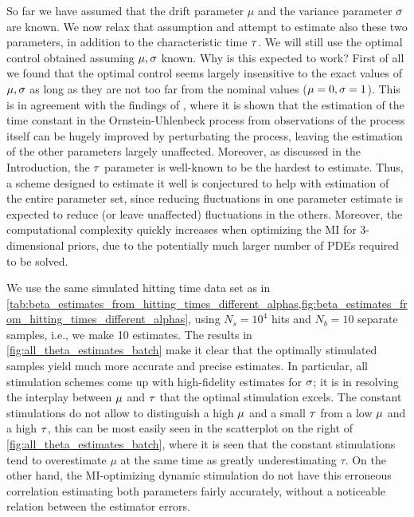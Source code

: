 \documentclass[12pt]{article}
\begin{document}
So far we have assumed that the drift parameter $\mu$ and the variance
parameter ${\sigma }$ are known. We now relax that
assumption and attempt to estimate also these two parameters,
 in addition to the 
characteristic time ${ \tau }$. We will still use the optimal control obtained assuming
${\mu },{\sigma }$ known. Why is this expected to work? First of all we found that the
optimal control seems largely insensitive to the exact values of ${\mu },{\sigma }$ as long
as they are not too far from the nominal values (${\mu }=0, {\sigma }=1$). This
is in agreement with the findings of
\cite{DitlevsenLansky212}, where it is shown that the estimation of the time constant in the
Ornstein-Uhlenbeck process from observations of the process itself can be hugely improved by perturbating the
process, leaving the estimation of the other parameters largely
unaffected. Moreover, as
discussed in the Introduction, the ${ \tau }$ parameter is well-known to be the
hardest to estimate. Thus, a scheme designed to estimate it well is conjectured
to help with estimation of the entire parameter set, since reducing fluctuations
in one parameter estimate is expected to reduce (or leave unaffected)
fluctuations in the others. Moreover, the computational complexity 
quickly increases when optimizing the MI for
3-dimensional priors, due to the potentially much larger number of PDEs required to be solved.


We use the same simulated hitting time data set as in
\cref{tab:beta_estimates_from_hitting_times_different_alphas,fig:beta_estimates_from_hitting_times_different_alphas},
using $N_s=10^4$ hits and $N_b=10$ separate samples, i.e., we make 10 estimates.
The results in \cref{fig:all_theta_estimates_batch} make it clear that the
optimally stimulated samples yield much more accurate and precise estimates. In
particular, all stimulation schemes come up with high-fidelity estimates for
${\sigma }$; it is in resolving the interplay between ${\mu }$ and ${ \tau }$ that the optimal
stimulation excels. The constant stimulations do not allow to distinguish a high
${\mu }$ and a small ${ \tau }$ from a low ${\mu }$ and a high ${ \tau }$, this can be most easily
seen in the scatterplot on the right of \cref{fig:all_theta_estimates_batch},
where it is seen that the constant stimulations tend to overestimate $\mu$ at
the same time as greatly underestimating $\tau$. On the other hand, the
MI-optimizing dynamic stimulation do not have this erroneous correlation
estimating both parameters fairly accurately, without a noticeable relation
between the estimator errors.  
\end{document}
